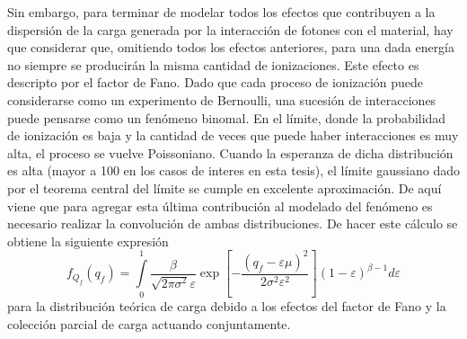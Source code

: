 Sin embargo, para terminar de modelar todos los efectos que contribuyen a la dispersión de la carga generada por la interacción de fotones con el material, hay que considerar que, omitiendo todos los efectos anteriores, para una dada energía no siempre se producirán la misma cantidad de ionizaciones. Este efecto es descripto por el factor de Fano. Dado que cada proceso de ionización puede considerarse como un experimento de Bernoulli, una sucesión de interacciones puede pensarse como un fenómeno binomal. En el límite, donde la probabilidad de ionización es baja y la cantidad de veces que puede haber interacciones es muy alta, el proceso se vuelve Poissoniano. Cuando la esperanza de dicha distribución es alta (mayor a 100 en los casos de interes en esta tesis), el límite gaussiano dado por el teorema central del límite se cumple en excelente aproximación. De aquí viene que para agregar esta última contribución al modelado del fenómeno es necesario realizar la convolución de ambas distribuciones. De hacer este cálculo se obtiene la siguiente expresión
\begin{equation*}
    f_{Q_{f}}(q_{f}) = 
    \int\limits_{0}^{1}
    \frac{\beta}{\sqrt{2\pi \sigma^{2}}\varepsilon}
    \exp[%
    -\frac{(q_{f}-\varepsilon\mu)^{2}}{2\sigma^{2}\varepsilon^{2}}
    ](1-\varepsilon)^{\beta - 1}
    d\varepsilon
\end{equation*}
para la distribución teórica de carga debido a los efectos del factor de Fano y la colección parcial de carga actuando conjuntamente.


